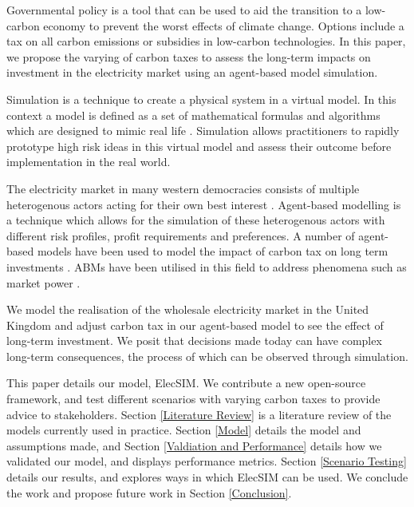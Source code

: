 
Governmental policy is a tool that can be used to aid the transition to a low-carbon economy to prevent the worst effects of climate change. Options include a tax on all carbon emissions or subsidies in low-carbon technologies. In this paper, we propose the varying of carbon taxes to assess the long-term impacts on investment in the electricity market using an agent-based model simulation. 


Simulation is a technique to create a physical system in a virtual model.  In this context a model is defined as a set of mathematical formulas and algorithms which are designed to mimic real life \cite{Forshaw2016}. Simulation allows practitioners to rapidly prototype high risk ideas in this virtual model and assess their outcome before implementation in the real world.

The electricity market in many western democracies consists of multiple heterogenous actors acting for their own best interest \cite{Most2010}. Agent-based modelling is a technique which allows for the simulation of these heterogenous actors with different risk profiles, profit requirements and preferences. A number of agent-based models have been used to model the impact of carbon tax on long term investments \cite{Tang2015, Chen2014, Chappin2017}. ABMs have been utilised in this field to address phenomena such as market power \cite{Ringler2016a}.

We model the realisation of the wholesale electricity market in the United Kingdom and adjust carbon tax in our agent-based model to see the effect of long-term investment. We posit that decisions made today can have complex long-term consequences, the process of which can be observed through simulation.



This paper details our model, ElecSIM. We contribute a new open-source framework, and test different scenarios with varying carbon taxes to provide advice to stakeholders. Section \ref{Literature Review} is a literature review of the models currently used in practice. Section \ref{Model} details the model and assumptions made, and Section \ref{Valdiation and Performance} details how we validated our model, and displays performance metrics. Section \ref{Scenario Testing} details our results, and explores ways in which ElecSIM can be used. We conclude the work and propose future work in Section \ref{Conclusion}.


